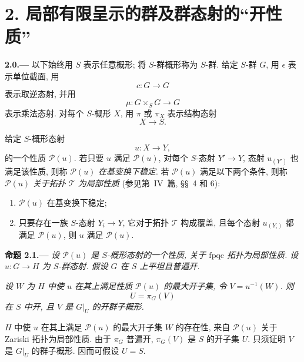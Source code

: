 
\section*{2. 局部有限呈示的群及群态射的``开性质''}
\label{sec:sga3-VIB-2}

\medskip
{}\label{par:sga3-VIB-2.0}%
\noindent\textbf{2.0.---}
以下始终用 \(S\) 表示任意概形; 将 \(S\)-群概形称为 \(S\)-群.
给定 \(S\)-群 \(G\), 用 \(\epsilon\) 表示单位截面, 用
\[
  c:G\longrightarrow G
\]
表示取逆态射, 并用
\[
  \mu:G\times_S G\longrightarrow G
\]
表示乘法态射. 对每个 \(S\)-概形 \(X\), 用 \(\pi\) 或 \(\pi_X\)
表示结构态射
\[
  X\longrightarrow S.
\]

给定 \(S\)-概形态射
\[
  u:X\longrightarrow Y,
\]
的一个性质 \(\mathscr P(u)\).
若只要 \(u\) 满足 \(\mathscr P(u)\), 对每个 \(S\)-态射 \(Y'\to Y\),
态射 \(u_{(Y')}\) 也满足该性质, 则称 \(\mathscr P(u)\)
\emph{在基变换下稳定}.
若 \(\mathscr P(u)\) 满足以下两个条件,
则称 \(\mathscr P(u)\) \emph{关于拓扑 \(\mathcal T\) 为局部性质}
(参见第~IV~篇, \S\S~4 和 6):
\begin{enumerate}
\item[\textup{a)}] \(\mathscr P(u)\) 在基变换下稳定;
\item[\textup{b)}] 只要存在一族 \(S\)-态射 \(Y_i\to Y\),
  它对于拓扑 \(\mathcal T\) 构成覆盖,
  且每个态射 \(u_{(Y_i)}\) 都满足 \(\mathscr P(u)\),
  则 \(u\) 满足 \(\mathscr P(u)\).
\end{enumerate}

\medskip
{}\label{prop:sga3-VIB-2.1}%
\noindent\textbf{命题 2.1.---}
\emph{设 \(\mathscr P(u)\) 是 \(S\)-概形态射的一个性质,
关于 \(\mathrm{fpqc}\) 拓扑为局部性质.
设 \(u:G\to H\) 为 \(S\)-群态射.
假设 \(G\) 在 \(S\) 上平坦且普遍开.}

\emph{设 \(W\) 为 \(H\) 中使 \(u\) 在其上满足性质
\(\mathscr P(u)\) 的最大开子集, 令 \(V=u^{-1}(W)\). 则
\[
  U=\pi_G(V)
\]
在 \(S\) 中开, 且 \(V\) 是 \(G|_U\) 的开群子概形.}

\(H\) 中使 \(u\) 在其上满足 \(\mathscr P(u)\) 的最大开子集
\(W\) 的存在性, 来自 \(\mathscr P(u)\) 关于 Zariski 拓扑为局部性质.
由于 \(\pi_G\) 普遍开, \(\pi_G(V)\) 是 \(S\) 的开子集 \(U\).
只须证明 \(V\) 是 \(G|_U\) 的群子概形. 因而可假设 \(U=S\).

